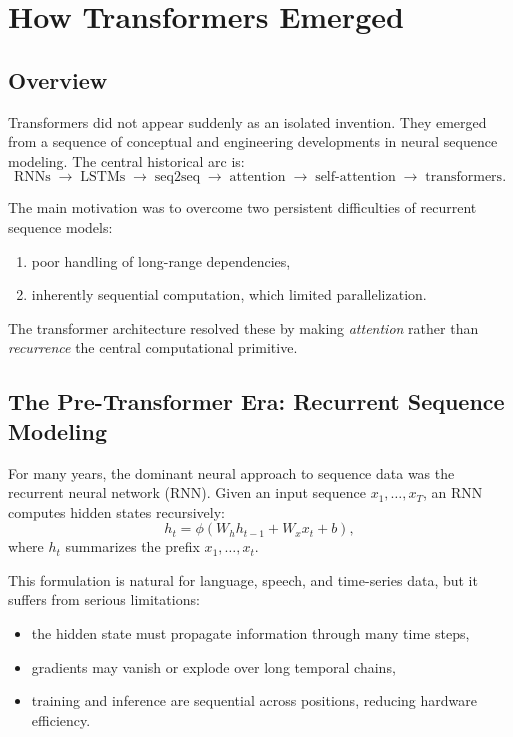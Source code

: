 \section{How Transformers Emerged}
\label{sec:transformers-emergence}

\subsection{Overview}

Transformers did not appear suddenly as an isolated invention. They emerged from a sequence of conceptual and engineering developments in neural sequence modeling. The central historical arc is:
\[
\text{RNNs} \;\longrightarrow\; \text{LSTMs} \;\longrightarrow\; \text{seq2seq} \;\longrightarrow\; \text{attention} \;\longrightarrow\; \text{self-attention} \;\longrightarrow\; \text{transformers}.
\]

The main motivation was to overcome two persistent difficulties of recurrent sequence models:
\begin{enumerate}
    \item poor handling of long-range dependencies,
    \item inherently sequential computation, which limited parallelization.
\end{enumerate}

The transformer architecture resolved these by making \emph{attention} rather than \emph{recurrence} the central computational primitive.

\subsection{The Pre-Transformer Era: Recurrent Sequence Modeling}

For many years, the dominant neural approach to sequence data was the recurrent neural network (RNN). Given an input sequence \(x_1,\dots,x_T\), an RNN computes hidden states recursively:
\[
h_t = \phi(W_h h_{t-1} + W_x x_t + b),
\]
where \(h_t\) summarizes the prefix \(x_1,\dots,x_t\).

This formulation is natural for language, speech, and time-series data, but it suffers from serious limitations:
\begin{itemize}
    \item the hidden state must propagate information through many time steps,
    \item gradients may vanish or explode over long temporal chains,
    \item training and inference are sequential across positions, reducing hardware efficiency.
\end{itemize}


